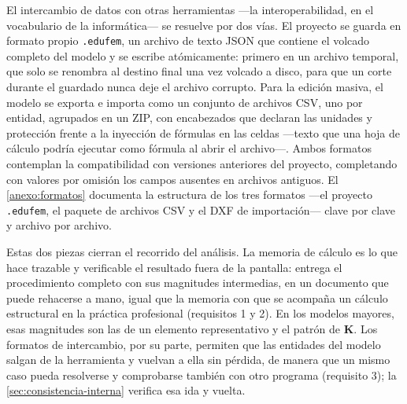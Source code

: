 El intercambio de datos con otras herramientas —la interoperabilidad, en el vocabulario de la informática— se resuelve por dos vías. El proyecto se guarda en formato propio \texttt{.edufem}, un archivo de texto JSON que contiene el volcado completo del modelo y se escribe atómicamente: primero en un archivo temporal, que solo se renombra al destino final una vez volcado a disco, para que un corte durante el guardado nunca deje el archivo corrupto. Para la edición masiva, el modelo se exporta e importa como un conjunto de archivos CSV, uno por entidad, agrupados en un ZIP, con encabezados que declaran las unidades y protección frente a la inyección de fórmulas en las celdas ---texto que una hoja de cálculo podría ejecutar como fórmula al abrir el archivo---. Ambos formatos contemplan la compatibilidad con versiones anteriores del proyecto, completando con valores por omisión los campos ausentes en archivos antiguos. El \autoref{anexo:formatos} documenta la estructura de los tres formatos —el proyecto \texttt{.edufem}, el paquete de archivos CSV y el DXF de importación— clave por clave y archivo por archivo.

Estas dos piezas cierran el recorrido del análisis. La memoria de cálculo es lo que hace trazable y verificable el resultado fuera de la pantalla: entrega el procedimiento completo con sus magnitudes intermedias, en un documento que puede rehacerse a mano, igual que la memoria con que se acompaña un cálculo estructural en la práctica profesional (requisitos 1 y 2). En los modelos mayores, esas magnitudes son las de un elemento representativo y el patrón de $\bm{K}$. Los formatos de intercambio, por su parte, permiten que las entidades del modelo salgan de la herramienta y vuelvan a ella sin pérdida, de manera que un mismo caso pueda resolverse y comprobarse también con otro programa (requisito 3); la \autoref{sec:consistencia-interna} verifica esa ida y vuelta.
